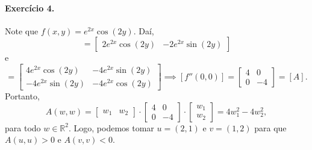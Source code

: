 \documentclass[12pt,a4paper]{article}
\newcommand{\R}{\mathbb{R}}
\begin{document}
\paragraph{Exercício 4.}
%
Note que $f(x,y) = e^{2x}\cos(2y)$. Daí,
%
\begin{equation*}
    [f'(x,y)] =
    \begin{bmatrix}
        2e^{2x}\cos(2y) & -2e^{2x}\sin(2y)
    \end{bmatrix}
\end{equation*}
%
e
%
\begin{equation*}
    [f''(x,y)] =
    \begin{bmatrix}
        4e^{2x}\cos(2y) & -4e^{2x}\sin(2y) \\
        -4e^{2x}\sin(2y) & -4e^{2x}\cos(2y)
    \end{bmatrix} \implies
    [f''(0,0)] =
    \begin{bmatrix}
        4 & 0 \\
        0 & -4
    \end{bmatrix} = [A].
\end{equation*}
%
Portanto, 
%
\begin{equation*}
    A(w,w) =
    \begin{bmatrix}
        w_1 & w_2
    \end{bmatrix}\cdot
    \begin{bmatrix}
        4 & 0 \\
        0 & -4
    \end{bmatrix}\cdot
    \begin{bmatrix}
        w_1 \\
        w_2
    \end{bmatrix} =
    4w_1^2 - 4w_2^2,
\end{equation*}
%
para todo $w\in\R^2$. Logo, podemos tomar $u = (2,1)$ e $v = (1,2)$ para que $A(u,u) > 0$ e $A(v,v) < 0$.
%
\end{document}
